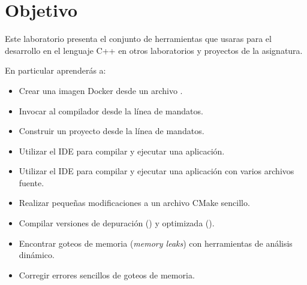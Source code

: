\section{Objetivo}

Este laboratorio presenta el conjunto de herramientas que usaras para el
desarrollo en el lenguaje C++ en otros laboratorios y proyectos de la
asignatura.

En particular aprenderás a:


\begin{itemize}

  \item Crear una imagen Docker desde un archivo .

  \item Invocar al compilador desde la línea de mandatos.

  \item Construir un proyecto desde la línea de mandatos.

  \item Utilizar el IDE  para compilar y ejecutar una
aplicación.

  \item Utilizar el IDE  para compilar y ejecutar una
aplicación con varios archivos fuente.

  \item Realizar pequeñas modificaciones a un archivo CMake sencillo.

  \item Compilar versiones de depuración () y optimizada
().

  \item Encontrar goteos de memoria (\emph{memory leaks}) con herramientas de
análisis dinámico.

  \item Corregir errores sencillos de goteos de memoria.

\end{itemize}
